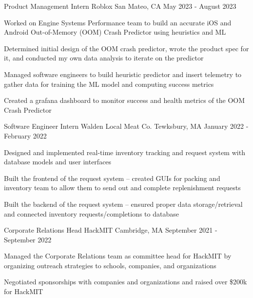 \documentclass[12pt, letterpaper]{awesome-cv}
\begin{document}
\begin{cventries}
  \cventry
      {Product Management Intern} %
      {Roblox} %
      {San Mateo, CA} %
      {May 2023 - August 2023} %
      {
        \begin{cvitems} %
          \item {Worked on Engine Systems Performance team to build an accurate iOS and Android Out-of-Memory (OOM) Crash Predictor using heuristics and ML}
          \item {Determined initial design of the OOM crash predictor, wrote the product spec for it, and conducted my own data analysis to iterate on the predictor}
          \item {Managed software engineers to build heuristic predictor and insert telemetry to gather data for training the ML model and computing success metrics}
          \item {Created a grafana dashboard to monitor success and health metrics of the OOM Crash Predictor}
      \end{cvitems}
    }

  \cventry
      {Software Engineer Intern} %
      {Walden Local Meat Co.} %
      {Tewksbury, MA} %
      {January 2022 - February 2022} %
      {
        \begin{cvitems} %
          \item {Designed and implemented real-time inventory tracking and request system with database models and user interfaces}
          \item {Built the frontend of the request system -- created GUIs for packing and inventory team to allow them to send out and complete replenishment requests}
          \item {Built the backend of the request system -- ensured proper data storage/retrieval and connected inventory requests/completions to database}
      \end{cvitems}
    }

  \cventry
    {Corporate Relations Head} %
    {HackMIT} %
    {Cambridge, MA} %
    {September 2021 - September 2022} %
    {
      \begin{cvitems} %
        \item {Managed the Corporate Relations team as committee head for HackMIT by organizing outreach strategies to schools, companies, and organizations}
        \item {Negotiated sponsorships with companies and organizations and raised over \$200k for HackMIT}
      \end{cvitems}
    }


\end{cventries}
\end{document}
